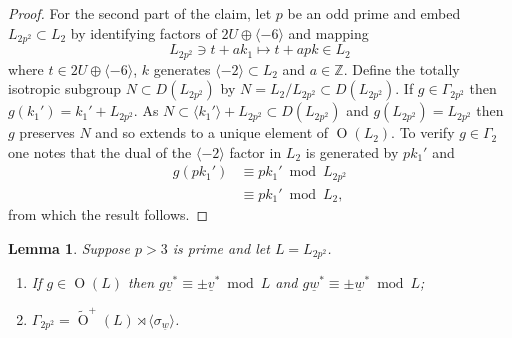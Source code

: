 \documentclass[11pt]{article}
\newtheorem{lem}[thm]{Lemma}
\newcommand{\ZZ}{\mathbb{Z}}
\newcommand{\la}{\langle}
\newcommand{\ra}{\rangle}
\newcommand{\opn}{\operatorname}
\newcommand{\op}{\oplus}
\newcommand{\beq}{\begin{equation*}}
\newcommand{\eeq}{\end{equation*}}
\begin{document}
\begin{proof}
  For the second part of the claim, let $p$ be an odd prime and embed $L_{2p^2} \subset L_2$ by identifying factors of $2U \op \la -6 \ra$ and mapping
  \beq
  L_{2p^2} \ni t + ak_1 \mapsto t + apk \in L_2
  \eeq
  where $t \in 2U \op \la -6 \ra$, $k$ generates $\la -2 \ra \subset L_2$ and $a \in \ZZ$.
  Define the totally isotropic subgroup $N \subset D(L_{2p^2})$ by $N = L_2 / L_{2p^2} \subset D(L_{2p^2})$.
  If $g \in \Gamma_{2p^2}$ then $g(k_1') = k_1' + L_{2p^2}$.
  As $N \subset \la k_1' \ra + L_{2p^2} \subset D(L_{2p^2})$ and $g(L_{2p^2}) = L_{2p^2}$ then $g$ preserves $N$ and so extends to a unique element of $\opn{O}(L_2)$.
  To verify $g \in \Gamma_2$ one notes that
  the dual of the $\la -2 \ra$ factor in $L_2$ is generated by $pk_1'$ and
  \begin{align*}
    g(pk_1')
    & \equiv p k_1 ' \bmod{L_{2p^2}} \\
    & \equiv p k_1' \bmod{L_2},
  \end{align*}
  from which the result follows.
\end{proof}
\begin{lem}\label{pmvlem}
  Suppose $p>3$ is prime and let $L=L_{2p^2}$.
  \begin{enumerate}
  \item If $g \in \opn{O}(L)$ then $g \underline{v}^* \equiv \pm \underline{v}^* \bmod{ L}$ and $g \underline{w}^* \equiv \pm \underline{w}^* \bmod{ L}$;
  \item $\Gamma_{2p^2} = \widetilde{\opn{O}}^+(L) \rtimes \la \sigma_{\underline{w}} \ra$.
  \end{enumerate}
\end{lem}
\end{document}
